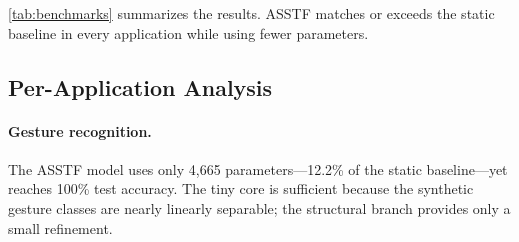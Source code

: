\documentclass[11pt,a4paper]{article}
\theoremstyle{definition}
\begin{document}
\begin{table}[t]
\centering
\small
\setlength{\tabcolsep}{4pt}
\caption{ASSTF vs.	static baseline across six applications. Data: App 01--05 use reproducible synthetic benchmarks; App 06 uses real SST-2 with a custom SentencePiece tokenizer.}
\label{tab:benchmarks}
\end{table}

\cref{tab:benchmarks} summarizes the results. ASSTF matches or exceeds the static baseline in every application while using fewer parameters.

\subsection{Per-Application Analysis}
\label{subsec:per_app}

\paragraph{Gesture recognition.} The ASSTF model uses only 4,665 parameters---12.2\% of the static baseline---yet reaches 100\% test accuracy. The tiny core is sufficient because the synthetic gesture classes are nearly linearly separable; the structural branch provides only a small refinement.
\end{document}

